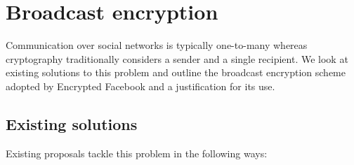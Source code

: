 





\section{Broadcast encryption}

Communication over social networks is typically one-to-many whereas cryptography traditionally considers a sender and a single recipient. We look at existing solutions to this problem and outline the broadcast encryption scheme adopted by Encrypted Facebook and a justification for its use.

\subsection{Existing solutions}

Existing proposals tackle this problem in the following ways:


